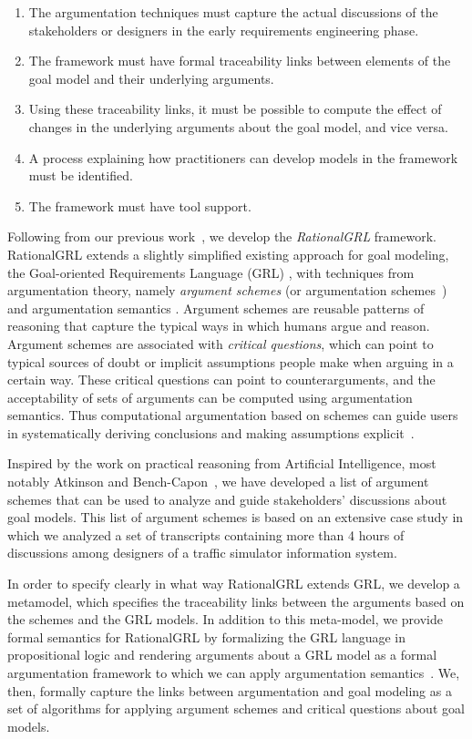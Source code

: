 \begin{enumerate}
\item 
The argumentation techniques must capture the actual discussions of the stakeholders or designers in the early requirements engineering phase.
\item 
The framework must have formal traceability links between elements of the goal model and their underlying arguments.
\item 
Using these traceability links, it must be possible to compute the effect of changes in the underlying arguments about the goal model, and vice versa.
\item 
A process explaining how practitioners can develop models in the framework must be identified.
\item 
The framework must have tool support.
\end{enumerate}

Following from our previous work~\cite{vanzee-etal:renext2015,vanZee-etal:er2016}, we develop the \emph{RationalGRL} framework. RationalGRL extends a slightly simplified existing approach for goal modeling, the Goal-oriented Requirements Language (GRL) \cite{Amyot:2010:EGM:1841349.1841356}, with techniques from argumentation theory, namely \emph{argument schemes} (or argumentation schemes~\cite{walton-etal2008}) and argumentation semantics \cite{Dung1995}. Argument schemes are reusable patterns of reasoning that capture the typical ways in which humans argue and reason. Argument schemes are associated with \emph{critical questions}, which can point to typical sources of doubt or implicit assumptions people make when arguing in a certain way. These critical questions can point to counterarguments, and the acceptability of sets of arguments can be computed using argumentation semantics. Thus computational argumentation based on schemes can guide users in systematically deriving conclusions and making assumptions explicit~\cite{bexEtal2003,murukannaiah2015}. 

Inspired by the work on practical reasoning from Artificial Intelligence, most notably Atkinson and Bench-Capon~\cite{atkinson2007}, we have developed a list of argument schemes that can be used to analyze and guide stakeholders' discussions about goal models. This list of argument schemes is based on an extensive case study in which we analyzed a set of transcripts containing more than 4 hours of discussions among designers of a traffic simulator information system. 

In order to specify clearly in what way RationalGRL extends GRL, we develop a metamodel, which specifies the traceability links between the arguments based on the schemes and the GRL models. In addition to this meta-model, we provide formal semantics for RationalGRL by formalizing the GRL language in propositional logic and rendering arguments about a GRL model as a formal argumentation framework to which we can apply argumentation semantics~\cite{Dung1995}. We, then, formally capture the links between argumentation and goal modeling as a set of algorithms for applying argument schemes and critical questions about goal models. 

